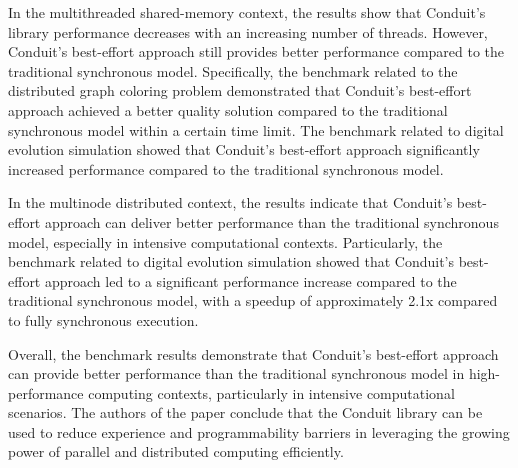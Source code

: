 \documentclass[11pt]{article}
\begin{document}
\begin{multicols*}{2}[\columnsep=1cm]
    In the multithreaded shared-memory context, the results show that Conduit's library performance decreases with an increasing number of threads. However, Conduit's best-effort approach still provides better performance compared to the traditional synchronous model. Specifically, the benchmark related to the distributed graph coloring problem demonstrated that Conduit's best-effort approach achieved a better quality solution compared to the traditional synchronous model within a certain time limit. The benchmark related to digital evolution simulation showed that Conduit's best-effort approach significantly increased performance compared to the traditional synchronous model.
    
    In the multinode distributed context, the results indicate that Conduit's best-effort approach can deliver better performance than the traditional synchronous model, especially in intensive computational contexts. Particularly, the benchmark related to digital evolution simulation showed that Conduit's best-effort approach led to a significant performance increase compared to the traditional synchronous model, with a speedup of approximately 2.1x compared to fully synchronous execution.
    
    Overall, the benchmark results demonstrate that Conduit's best-effort approach can provide better performance than the traditional synchronous model in high-performance computing contexts, particularly in intensive computational scenarios. The authors of the paper conclude that the Conduit library can be used to reduce experience and programmability barriers in leveraging the growing power of parallel and distributed computing efficiently.
    

\end{multicols*}
\end{document}

